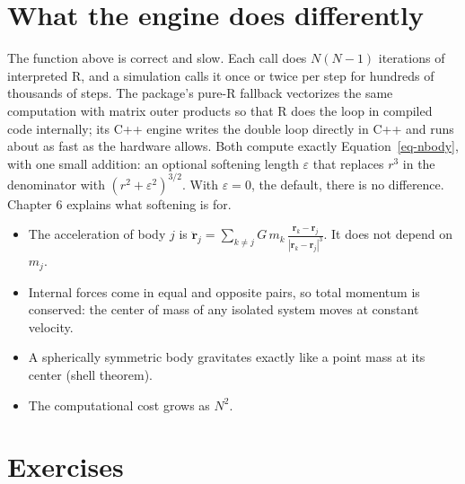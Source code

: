\documentclass[
  10.5pt,
  letterpaper,
]{scrbook}
\providecommand{\tightlist}{%
  \setlength{\itemsep}{0pt}\setlength{\parskip}{0pt}}
\theoremstyle{definition}
\theoremstyle{plain}
\theoremstyle{remark}
\begin{document}
\section{What the engine does
differently}\label{what-the-engine-does-differently}

The function above is correct and slow. Each call does \(N(N-1)\)
iterations of interpreted R, and a simulation calls it once or twice per
step for hundreds of thousands of steps. The package's pure-R fallback
vectorizes the same computation with matrix outer products so that R
does the loop in compiled code internally; its C++ engine writes the
double loop directly in C++ and runs about as fast as the hardware
allows. Both compute exactly Equation~\ref{eq-nbody}, with one small
addition: an optional softening length \(\varepsilon\) that replaces
\(r^3\) in the denominator with \((r^2 + \varepsilon^2)^{3/2}\). With
\(\varepsilon = 0\), the default, there is no difference. Chapter 6
explains what softening is for.

\begin{tcolorbox}[enhanced jigsaw, arc=.35mm, bottomrule=.15mm, bottomtitle=1mm, breakable, colback=white, colbacktitle=quarto-callout-tip-color!10!white, colframe=quarto-callout-tip-color-frame, coltitle=black, left=2mm, leftrule=.75mm, opacityback=0, opacitybacktitle=0.6, rightrule=.15mm, title={Key results}, titlerule=0mm, toprule=.15mm, toptitle=1mm]

\begin{itemize}
\tightlist
\item
  The acceleration of body \(j\) is
  \(\displaystyle \ddot{\mathbf{r}}_j = \sum_{k \neq j} G\,m_k\,\frac{\mathbf{r}_k - \mathbf{r}_j}{|\mathbf{r}_k - \mathbf{r}_j|^3}\).
  It does not depend on \(m_j\).
\item
  Internal forces come in equal and opposite pairs, so total momentum is
  conserved: the center of mass of any isolated system moves at constant
  velocity.
\item
  A spherically symmetric body gravitates exactly like a point mass at
  its center (shell theorem).
\item
  The computational cost grows as \(N^2\).
\end{itemize}

\end{tcolorbox}

\section*{Exercises}\label{exercises-2}
\end{document}
